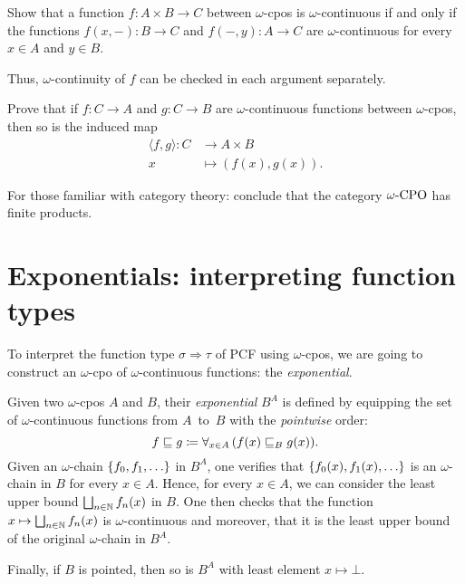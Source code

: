 \begin{exercise}\label{exer:continuity-in-each-argument}
  Show that a function \(f \colon A \times B \to C\) between \(\omega\)-cpos is
  \(\omega\)-continuous if and only if the functions \(f(x,-) \colon B \to C\) and
  \(f(-,y) \colon A \to C\) are \(\omega\)-continuous for every \(x \in A\) and
  \(y \in B\).

  Thus, \(\omega\)-continuity of \(f\) can be checked in each argument
  separately.
\end{exercise}

\begin{exercise}\label{exer:product-induced}
  Prove that if \(f \colon C \to A\) and \(g \colon C \to B\) are
  \(\omega\)-continuous functions between \(\omega\)-cpos, then so is the
  induced map
  \begin{align*}
    \langle f , g \rangle  \colon C &\to A \times B \\
    x &\mapsto (f(x),g(x)).
  \end{align*}

  For those familiar with category theory: conclude that the category
  \(\omegaCPO\) has finite products.
\end{exercise}

\section{Exponentials: interpreting function types}

To interpret the function type \(\sigma \Rightarrow \tau\) of PCF using
\(\omega\)-cpos, we are going to construct an \(\omega\)-cpo of
\(\omega\)-continuous functions: the \emph{exponential}.

\begin{definition}\label{def:exponential}
  Given two \(\omega\)-cpos \(A\) and \(B\), their \emph{exponential} \(B^A\) is
  defined by equipping the set of \(\omega\)-continuous functions from
  \(A\)~to~\(B\) with the \emph{pointwise} order:
  \[
    f \sqsubseteq g
    \coloneqq \forall_{x \in A} \, (f(x) \sqsubseteq_B g(x)).
  \]
  Given an \(\omega\)-chain \(\set{f_0,f_1,\dots}\) in \(B^A\), one verifies
  that \(\set{f_0(x),f_1(x),\dots}\) is an \(\omega\)-chain in \(B\) for every
  \(x \in A\).
  Hence, for every \(x \in A\), we can consider the least upper bound
  \(\bigsqcup_{n \in \mathbb N}f_n(x)\) in \(B\).
  One then checks that the function \(x \mapsto \bigsqcup_{n \in \mathbb N}f_n(x)\)
  is \(\omega\)-continuous and moreover, that it is the least upper bound of the
  original \(\omega\)-chain in \(B^A\).

  Finally, if \(B\) is pointed, then so is \(B^A\) with least
  element \(x \mapsto \bot\).
\end{definition}

